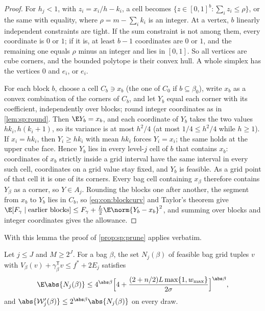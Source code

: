 \begin{proof}
For $h_j<1$, with $z_i=x_i/h-k_i$, a cell becomes
$\{z\in[0,1]^b:\sum_iz_i\le\rho\}$, or
the same with equality, where $\rho=m-\sum_ik_i$ is an integer. At a vertex,
$b$ linearly independent constraints are tight. If the sum constraint is not
among them, every coordinate is $0$ or $1$; if it is, at least $b-1$
coordinates are $0$ or $1$, and the remaining one equals $\rho$ minus an
integer and lies in $[0,1]$. So all vertices are cube corners, and the
bounded polytope is their convex hull. A whole simplex has the vertices $0$
and $e_i$, or $e_i$.

For each block $b$, choose a cell $C_b\ni x_b$ (the one of $C_0$ if $b\subseteq
\beta_0$), write $x_b$ as a convex combination of the corners of $C_b$, and let
$Y_b$ equal each corner with its coefficient, independently over blocks;
round integer coordinates as in \cref{lem:sp:round}. Then $\E Y_b=x_b$, and
each coordinate of $Y_b$ takes the two values $hk_i,h(k_i+1)$, so its variance
is at most $h^2/4$ (at most $1/4\le h^2/4$ while $h\ge1$). If $x_i=hk_i$, then
$Y_i\ge hk_i$ with mean $hk_i$ forces $Y_i=x_i$; the same holds at the upper
cube face. Hence $Y_b$ lies in every level-$j$ cell of $b$ that contains $x_b$:
coordinates of $x_b$ strictly inside a grid interval have the same interval in
every such cell, coordinates on a grid value stay fixed, and $Y_b$ is
feasible. As a grid point of that cell it is one of its corners. Every bag
cell containing $x_\beta$ therefore contains $Y_\beta$ as a corner, so
$Y\in A_j$. Rounding the blocks one after another, the segment from $x_b$ to
$Y_b$ lies in $C_b$, so \eqref{eq:con:blockcurv} and Taylor's theorem give
$\E[F_\gamma\mid\text{earlier blocks}]\le F_\gamma+\frac L2\E\norm{Y_b-x_b}^2$,
and summing over blocks and integer coordinates gives the allowance.
\end{proof}

With this lemma the proof of \cref{prop:sp:prune} applies verbatim.

\begin{lemma}\label{lem:con:simplex-count}
Let $j\le J$ and $M\ge2^J$. For a bag $\beta$, the set $N_j(\beta)$ of feasible
bag grid tuples $v$ with $V_\beta(v)+\gamma_\beta^{\mathsf T}v\le f^*+2E_j$
satisfies
\[
 \E\abs{N_j(\beta)}\le4^{\abs\beta}\Bigl[4+\frac{(2+n/2)L\max\{1,w_{\max}\}}{2\sigma}\Bigr]^{\abs\beta},
\]
and $\abs{\mathcal W'_j(\beta)}\le2^{\abs\beta}\abs{N_j(\beta)}$ on every draw.
\end{lemma}

